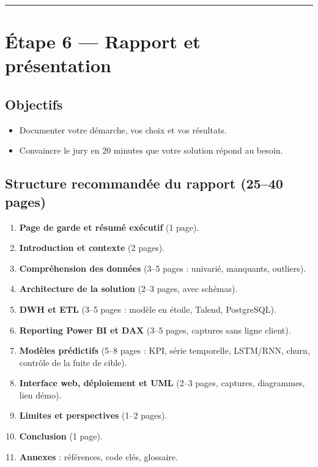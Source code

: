 \documentclass[11pt,a4paper]{article}
\providecommand{\tightlist}{\setlength{\itemsep}{0pt}\setlength{\parskip}{0pt}}
\begin{document}
\begin{center}\rule{0.5\linewidth}{0.5pt}\end{center}

\section{Étape 6 --- Rapport et
présentation}\label{uxe9tape-6-rapport-et-pruxe9sentation}

\subsection{Objectifs}\label{objectifs-1}

\begin{itemize}
\tightlist
\item
  Documenter votre démarche, vos choix et vos résultats.
\item
  Convaincre le jury en 20 minutes que votre solution répond au besoin.
\end{itemize}

\subsection{Structure recommandée du rapport (25--40
pages)}\label{structure-recommanduxe9e-du-rapport-2540-pages}

\begin{enumerate}
\def\labelenumi{\arabic{enumi}.}
\tightlist
\item
  \textbf{Page de garde et résumé exécutif} (1 page).
\item
  \textbf{Introduction et contexte} (2 pages).
\item
  \textbf{Compréhension des données} (3--5 pages : univarié, manquants,
  outliers).
\item
  \textbf{Architecture de la solution} (2--3 pages, avec schémas).
\item
  \textbf{DWH et ETL} (3--5 pages : modèle en étoile, Talend,
  PostgreSQL).
\item
  \textbf{Reporting Power BI et DAX} (3--5 pages, captures sans ligne
  client).
\item
  \textbf{Modèles prédictifs} (5--8 pages : KPI, série temporelle,
  LSTM/RNN, churn, contrôle de la fuite de cible).
\item
  \textbf{Interface web, déploiement et UML} (2--3 pages, captures,
  diagrammes, lien démo).
\item
  \textbf{Limites et perspectives} (1--2 pages).
\item
  \textbf{Conclusion} (1 page).
\item
  \textbf{Annexes} : références, code clés, glossaire.
\end{enumerate}
\end{document}
